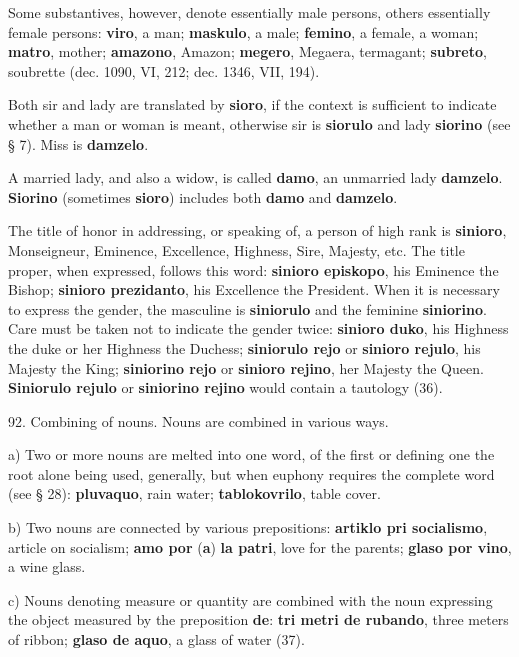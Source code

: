 Some substantives, however, denote essentially male persons, others essentially female persons: \textbf{viro}, a man; \textbf{maskulo}, a male; \textbf{femino}, a female, a woman; \textbf{matro}, mother; \textbf{amazono}, Amazon; \textbf{megero}, Megaera, termagant; \textbf{subreto}, soubrette (dec. 1090, VI, 212; dec. 1346, VII, 194). 

Both sir and lady are translated by \textbf{sioro}, if the context is sufficient to indicate whether a man or woman is meant, otherwise sir is \textbf{siorulo} and lady \textbf{siorino} (see § 7). Miss is \textbf{damzelo}. 

A married lady, and also a widow, is called \textbf{damo}, an unmarried lady \textbf{damzelo}. \textbf{Siorino} (sometimes \textbf{sioro}) includes both \textbf{damo} and \textbf{damzelo}. 

The title of honor in addressing, or speaking of, a person of high rank is \textbf{sinioro}, Monseigneur, Eminence, Excellence, Highness, Sire, Majesty, etc. The title proper, when expressed, follows this word: \textbf{sinioro episkopo}, his Eminence the Bishop; \textbf{sinioro prezidanto}, his Excellence the President. When it is necessary to express the gender, the masculine is \textbf{siniorulo} and the feminine \textbf{siniorino}. Care must be taken not to indicate the gender twice: \textbf{sinioro duko}, his Highness the duke or her Highness the Duchess; \textbf{siniorulo rejo} or \textbf{sinioro rejulo}, his Majesty the King; \textbf{siniorino rejo} or \textbf{sinioro rejino}, her Majesty the Queen. \textbf{Siniorulo rejulo} or \textbf{siniorino rejino} would contain a tautology (36). 

92. Combining of nouns. Nouns are combined in various ways. 

a) Two or more nouns are melted into one word, of the first or defining one the root alone being used, generally, but when euphony requires the complete word (see § 28): \textbf{pluvaquo}, rain water; \textbf{tablokovrilo}, table cover. 

b) Two nouns are connected by various prepositions: \textbf{artiklo pri socialismo}, article on socialism; \textbf{amo por }(\textbf{a})\textbf{ la patri}, love for the parents; \textbf{glaso por vino}, a wine glass. 

c) Nouns denoting measure or quantity are combined with the noun expressing the object measured by the preposition \textbf{de}: \textbf{tri metri de rubando}, three meters of ribbon; \textbf{glaso de aquo}, a glass of water (37). 


